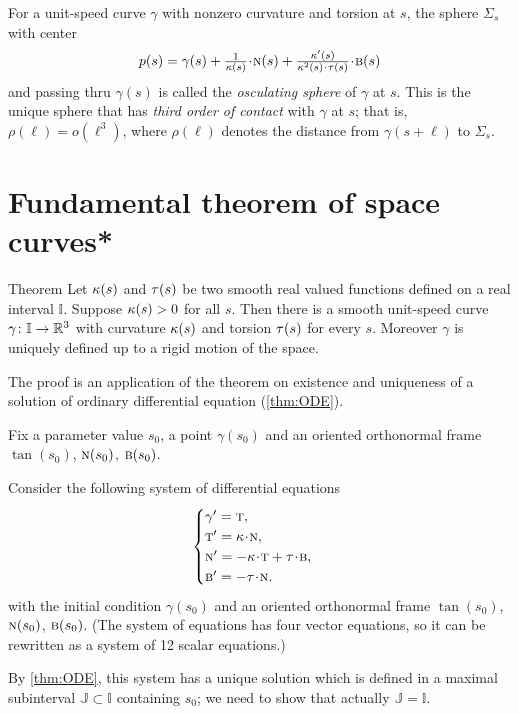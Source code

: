 For a unit-speed curve $\gamma$ with nonzero curvature and torsion at $s$,
the sphere $\Sigma_s$ with center
\[p(s)=\gamma(s)+\tfrac1{\kur(s)}\cdot \norm(s)+\tfrac{\kur'(s)}{\kur^2(s)\cdot\tor(s)}\cdot\bi(s)\]
and passing thru $\gamma(s)$ is called the \emph{osculating sphere} of $\gamma$ at $s$.
This is the unique sphere that has \emph{third order of contact} with $\gamma$ at $s$;
that is, $\rho(\ell)=o(\ell^3)$, where $\rho(\ell)$ denotes the distance from $\gamma(s+\ell)$ to $\Sigma_s$.
 
\section{Fundamental theorem of space curves*}

\begin{thm}{Theorem}\label{thm:fund-curves}
Let $\kappa(s)$ and $\tau(s)$ be two smooth real valued functions defined on a real interval $\mathbb{I}$.
Suppose $\kappa(s)>0$ for all $s$.
Then there is a smooth unit-speed curve $\gamma\colon\mathbb{I}\to\mathbb{R}^3$ with curvature $\kappa(s)$ and torsion $\tau(s)$ for every $s$.
Moreover $\gamma$ is uniquely defined up to a rigid motion of the space.
\end{thm}

The proof is an application of the theorem on existence and uniqueness of a solution of ordinary differential equation (\ref{thm:ODE}).

Fix a parameter value $s_0$, a point $\gamma(s_0)$ and an oriented orthonormal frame $\tan(s_0)$, $\textsc{n}(s_0)$, $\textsc{b}(s_0)$.

Consider the following system of differential equations
\[
\begin{cases}
\gamma'=\tan,
\\
\tan'=\kur\cdot\norm,
\\
\norm'=-\kur\cdot\tan+\tor\cdot\bi,
\\
\bi'=-\tor\cdot\norm.
\end{cases}
\]
with the initial condition $\gamma(s_0)$ and an oriented orthonormal frame $\tan(s_0)$, $\textsc{n}(s_0)$, $\textsc{b}(s_0)$.
(The system of equations has four vector equations, so it can be rewritten as a system of 12 scalar equations.)

By \ref{thm:ODE}, this system has a unique solution which is defined in a maximal subinterval $\mathbb{J}\subset \mathbb{I}$ containing $s_0$; we need to show that actually $\mathbb{J}= \mathbb{I}$.


